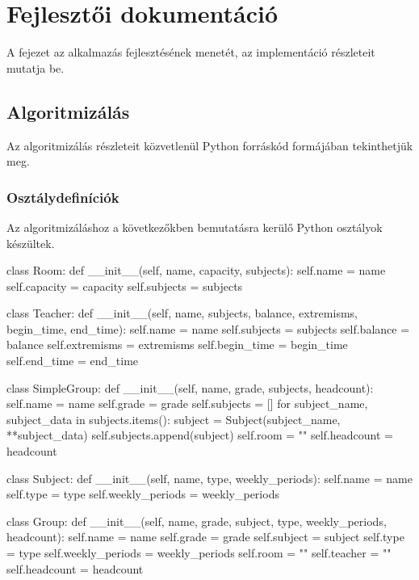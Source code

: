\chapter{Fejlesztői dokumentáció}

A fejezet az alkalmazás fejlesztésének menetét, az implementáció részleteit mutatja be.

\section{Algoritmizálás}

Az algoritmizálás részleteit közvetlenül Python forráskód formájában tekinthetjük meg.

\subsection{Osztálydefiníciók}

Az algoritmizáláshoz a következőkben bemutatásra kerülő Python osztályok készültek.

\begin{python}
class Room:
    def __init__(self, name, capacity, subjects):
        self.name = name
        self.capacity = capacity
        self.subjects = subjects


class Teacher:
    def __init__(self, name, subjects, balance, extremisms, begin_time,
                 end_time):
        self.name = name
        self.subjects = subjects
        self.balance = balance
        self.extremisms = extremisms
        self.begin_time = begin_time
        self.end_time = end_time


class SimpleGroup:
    def __init__(self, name, grade, subjects, headcount):
        self.name = name
        self.grade = grade
        self.subjects = []
        for subject_name, subject_data in subjects.items():
            subject = Subject(subject_name, **subject_data)
            self.subjects.append(subject)
        self.room = ""
        self.headcount = headcount


class Subject:
    def __init__(self, name, type, weekly_periods):
        self.name = name
        self.type = type
        self.weekly_periods = weekly_periods


class Group:
    def __init__(self, name, grade, subject, type, weekly_periods,
                 headcount):
        self.name = name
        self.grade = grade
        self.subject = subject
        self.type = type
        self.weekly_periods = weekly_periods
        self.room = ""
        self.teacher = ""
        self.headcount = headcount
\end{python}


